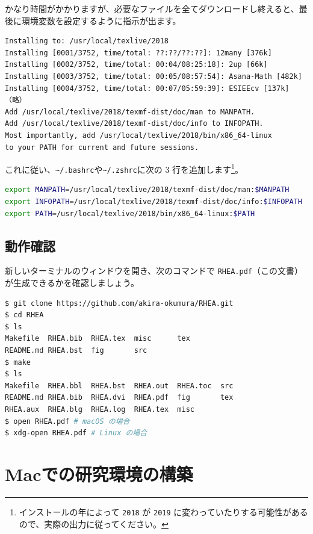 かなり時間がかかりますが、必要なファイルを全てダウンロードし終えると、最後に環境変数を設定するように指示が出ます。

\begin{lstlisting}
Installing to: /usr/local/texlive/2018
Installing [0001/3752, time/total: ??:??/??:??]: 12many [376k]
Installing [0002/3752, time/total: 00:04/08:25:18]: 2up [66k]
Installing [0003/3752, time/total: 00:05/08:57:54]: Asana-Math [482k]
Installing [0004/3752, time/total: 00:07/05:59:39]: ESIEEcv [137k]
（略）
Add /usr/local/texlive/2018/texmf-dist/doc/man to MANPATH.
Add /usr/local/texlive/2018/texmf-dist/doc/info to INFOPATH.
Most importantly, add /usr/local/texlive/2018/bin/x86_64-linux
to your PATH for current and future sessions.
\end{lstlisting}

これに従い、\texttt{\~{}/.bashrc}や\texttt{\~{}/.zshrc}に次の 3 行を追加します\footnote{インストールの年によって \texttt{2018} が \texttt{2019} に変わっていたりする可能性があるので、実際の出力に従ってください。}。

\begin{lstlisting}[language=bash]
export MANPATH=/usr/local/texlive/2018/texmf-dist/doc/man:$MANPATH
export INFOPATH=/usr/local/texlive/2018/texmf-dist/doc/info:$INFOPATH
export PATH=/usr/local/texlive/2018/bin/x86_64-linux:$PATH
\end{lstlisting}

\section{動作確認}

新しいターミナルのウィンドウを開き、次のコマンドで \texttt{RHEA.pdf}（この文書）が生成できるかを確認しましょう。

\begin{lstlisting}[language=bash]
$ git clone https://github.com/akira-okumura/RHEA.git
$ cd RHEA
$ ls
Makefile  RHEA.bib  RHEA.tex  misc      tex
README.md RHEA.bst  fig       src
$ make
$ ls
Makefile  RHEA.bbl  RHEA.bst  RHEA.out  RHEA.toc  src
README.md RHEA.bib  RHEA.dvi  RHEA.pdf  fig       tex
RHEA.aux  RHEA.blg  RHEA.log  RHEA.tex  misc
$ open RHEA.pdf # macOS の場合
$ xdg-open RHEA.pdf # Linux の場合
\end{lstlisting}

\chapter{Macでの研究環境の構築}
\label{chap:Mac}

